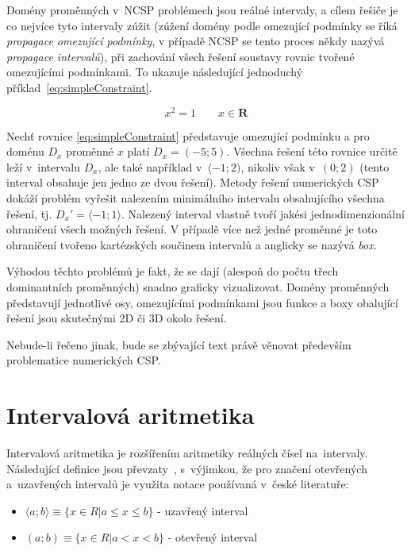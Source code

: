 Domény proměnných v~NCSP problémech jsou reálné intervaly, a cílem řešiče je co nejvíce tyto intervaly zúžit (zúžení domény podle omezující podmínky se říká \emph{propagace omezující podmínky}, v případě NCSP se tento proces někdy nazývá \emph{propagace intervalů}), při zachování všech řešení soustavy rovnic tvořené omezujícími podmínkami. To ukazuje následující jednoduchý příklad~\ref{eq:simpleConstraint}.

\begin{equation} \label{eq:simpleConstraint}
x^2 = 1\qquad x \in \boldsymbol{R}
\end{equation}

Nechť rovnice \ref{eq:simpleConstraint} představuje omezující podmínku a pro doménu $D_x$ proměnné $x$ platí $D_x = (-5;5)$. Všechna řešení této rovnice určitě leží v~intervalu $D_x$, ale také například v~$\langle -1;2)$, nikoliv však v~$(0;2)$ (tento interval obsahuje jen jedno ze dvou řešení). Metody řešení numerických CSP dokáží problém vyřešit nalezením minimálního intervalu obsahujícího všechna řešení, tj. $D_x' = \langle -1;1\rangle$. Nalezený interval vlastně tvoří jakési jednodimenzionální ohraničení všech možných řešení. V případě více než jedné proměnné je toto ohraničení tvořeno kartézských součinem intervalů a anglicky se nazývá \emph{box}.

Výhodou těchto problémů je fakt, že se dají (alespoň do počtu třech dominantních proměnných) snadno graficky vizualizovat. Domény proměnných představují jednotlivé osy, omezujícími podmínkami jsou funkce a boxy obalující řešení jsou skutečnými 2D či 3D  okolo řešení.

Nebude-li řečeno jinak, bude se zbývající text právě věnovat především problematice numerických CSP.



\section{Intervalová aritmetika}
\label{ch:interval_arithmetic}
Intervalová aritmetika je rozšířením aritmetiky reálných čísel na~intervaly. Následující definice jsou převzaty~\cite{Moore:09}, s~výjimkou, že pro značení otevřených a~uzavřených intervalů je využita notace používaná v~české literatuře:

\begin{itemize}
    \item $\langle a;b \rangle \equiv \{x \in R | a \le x \le b \} $ - uzavřený interval
    \item $(a;b) \equiv \{ x \in R | a < x < b \}$ - otevřený interval
\end{itemize}

